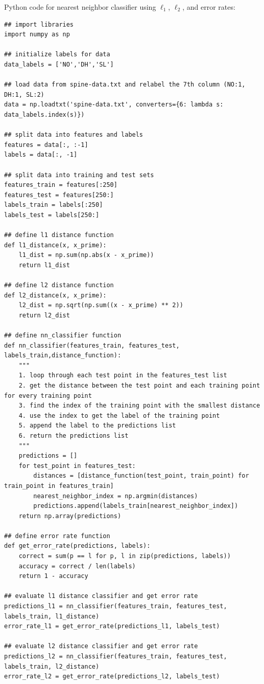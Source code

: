 \documentclass{article}
\begin{document}
\parbox{\textwidth}{Python code for nearest neighbor classifier using $\ell_1$, $\ell_2$, and error rates:}
\begin{center}

\begin{lstlisting}
## import libraries
import numpy as np

## initialize labels for data
data_labels = ['NO','DH','SL']
  
## load data from spine-data.txt and relabel the 7th column (NO:1, DH:1, SL:2)          
data = np.loadtxt('spine-data.txt', converters={6: lambda s: data_labels.index(s)})
  
## split data into features and labels
features = data[:, :-1]
labels = data[:, -1]
  
## split data into training and test sets
features_train = features[:250]
features_test = features[250:]
labels_train = labels[:250]
labels_test = labels[250:]

## define l1 distance function
def l1_distance(x, x_prime):
    l1_dist = np.sum(np.abs(x - x_prime))
    return l1_dist

## define l2 distance function
def l2_distance(x, x_prime):
    l2_dist = np.sqrt(np.sum((x - x_prime) ** 2))
    return l2_dist

## define nn_classifier function
def nn_classifier(features_train, features_test, labels_train,distance_function):
    """
    1. loop through each test point in the features_test list
    2. get the distance between the test point and each training point for every training point
    3. find the index of the training point with the smallest distance
    4. use the index to get the label of the training point
    5. append the label to the predictions list
    6. return the predictions list
    """
    predictions = []
    for test_point in features_test:
        distances = [distance_function(test_point, train_point) for train_point in features_train]
        nearest_neighbor_index = np.argmin(distances)
        predictions.append(labels_train[nearest_neighbor_index])
    return np.array(predictions)

## define error rate function
def get_error_rate(predictions, labels):
    correct = sum(p == l for p, l in zip(predictions, labels))
    accuracy = correct / len(labels)
    return 1 - accuracy

## evaluate l1 distance classifier and get error rate
predictions_l1 = nn_classifier(features_train, features_test, labels_train, l1_distance)
error_rate_l1 = get_error_rate(predictions_l1, labels_test)

## evaluate l2 distance classifier and get error rate
predictions_l2 = nn_classifier(features_train, features_test, labels_train, l2_distance)
error_rate_l2 = get_error_rate(predictions_l2, labels_test)
\end{lstlisting}
    
\end{center}
\end{document}
